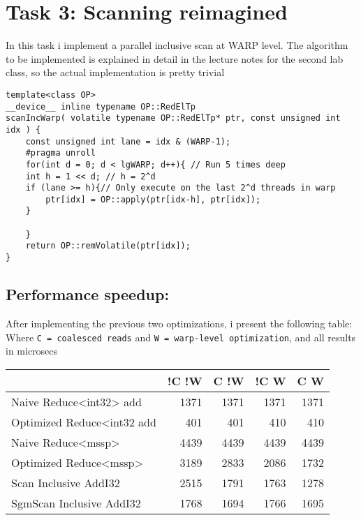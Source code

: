 \documentclass[11pt]{article}
\begin{document}
\section{Task 3: Scanning reimagined}
\label{sec:org1c3697d}
In this task i implement a parallel inclusive scan at WARP level. The algorithm
to be implemented is explained in detail in the lecture notes for the second 
lab class, so the actual implementation is pretty trivial
\begin{verbatim}
template<class OP>
__device__ inline typename OP::RedElTp
scanIncWarp( volatile typename OP::RedElTp* ptr, const unsigned int idx ) {
    const unsigned int lane = idx & (WARP-1);
    #pragma unroll
    for(int d = 0; d < lgWARP; d++){ // Run 5 times deep
	int h = 1 << d; // h = 2^d
	if (lane >= h){// Only execute on the last 2^d threads in warp
	    ptr[idx] = OP::apply(ptr[idx-h], ptr[idx]);
	}

    }
    return OP::remVolatile(ptr[idx]);
}
\end{verbatim}
\subsection{Performance speedup:}
\label{sec:orgcf5c507}
After implementing the previous two optimizations, i present the following table:  
Where \texttt{C = coalesced reads} and \texttt{W = warp-level optimization}, and all results in microsecs
\begin{center}
\begin{tabular}{lrrrr}
 & !C !W & C !W & !C W & C W\\
\hline
Naive Reduce<int32> add & 1371 & 1371 & 1371 & 1371\\
Optimized Reduce<int32 add & 401 & 401 & 410 & 410\\
Naive Reduce<mssp> & 4439 & 4439 & 4439 & 4439\\
Optimized Reduce<mssp> & 3189 & 2833 & 2086 & 1732\\
Scan Inclusive AddI32 & 2515 & 1791 & 1763 & 1278\\
SgmScan Inclusive AddI32 & 1768 & 1694 & 1766 & 1695\\
\end{tabular}
\end{center}
\end{document}
